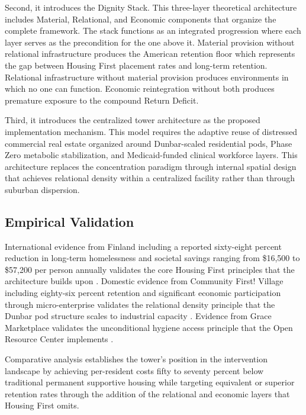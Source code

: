 \documentclass[12pt, letterpaper]{article}
\begin{document}
Second, it introduces the Dignity Stack. This three-layer theoretical architecture includes Material, Relational, and Economic components that organize the complete framework. The stack functions as an integrated progression where each layer serves as the precondition for the one above it. Material provision without relational infrastructure produces the American retention floor which represents the gap between Housing First placement rates and long-term retention. Relational infrastructure without material provision produces environments in which no one can function. Economic reintegration without both produces premature exposure to the compound Return Deficit.

Third, it introduces the centralized tower architecture as the proposed implementation mechanism. This model requires the adaptive reuse of distressed commercial real estate organized around Dunbar-scaled residential pods, Phase Zero metabolic stabilization, and Medicaid-funded clinical workforce layers. This architecture replaces the concentration paradigm through internal spatial design that achieves relational density within a centralized facility rather than through suburban dispersion.

\subsection{Empirical Validation}

International evidence from Finland including a reported sixty-eight percent reduction in long-term homelessness and societal savings ranging from \$16,500 to \$57,200 per person annually validates the core Housing First principles that the architecture builds upon \citep{sdg16plus_2023, yfoundation_2024}. Domestic evidence from Community First! Village including eighty-six percent retention and significant economic participation through micro-enterprise validates the relational density principle that the Dunbar pod structure scales to industrial capacity \citep{mlf_2024}. Evidence from Grace Marketplace validates the unconditional hygiene access principle that the Open Resource Center implements \citep{grace_marketplace_2024}.

Comparative analysis establishes the tower's position in the intervention landscape by achieving per-resident costs fifty to seventy percent below traditional permanent supportive housing while targeting equivalent or superior retention rates through the addition of the relational and economic layers that Housing First omits.
\end{document}
